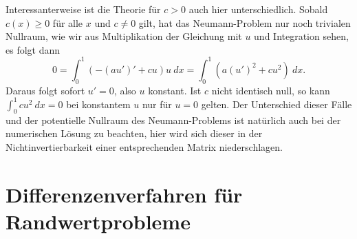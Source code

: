 Interessanterweise ist die Theorie f\"ur $c > 0$ auch hier unterschiedlich. Sobald $c(x) \geq 0$ f\"ur alle $x$ und $c\neq 0$ gilt, hat das Neumann-Problem nur noch trivialen Nullraum, wie wir aus Multiplikation der Gleichung mit $u$ und Integration sehen, es folgt dann
$$ 0 = \int_0^1 (-(au')' + c u) u ~dx = \int_0^1 (a(u')^2 + c u^2) ~dx. $$
Daraus folgt sofort $u'=0$, also $u$ konstant. Ist $c$ nicht identisch null, so kann $\int_0^1 c u^2~dx =0$ bei konstantem $u$ nur f\"ur $u=0$ gelten. Der Unterschied dieser F\"alle und der potentielle Nullraum des Neumann-Problems ist nat\"urlich auch bei der numerischen L\"osung zu beachten, hier wird sich dieser in der Nichtinvertierbarkeit einer entsprechenden Matrix niederschlagen. 


\section{Differenzenverfahren f\"ur Randwertprobleme} 

